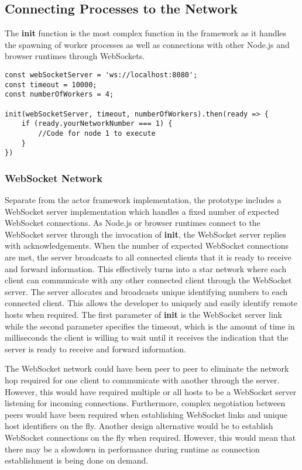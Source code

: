 \documentclass[12pt, a4paper]{report}
\theoremstyle{definition}
\theoremstyle{definition}%
\theoremstyle{definition}%
\theoremstyle{definition}%
\theoremstyle{definition}%
\theoremstyle{definition}%
\begin{document}
\subsection{Connecting Processes to the Network}
The \textbf{init} function is the most complex function in the framework as it handles the spawning of worker processes as well as connections with other Node.js and browser runtimes through WebSockets.
\begin{lstlisting}
const webSocketServer = 'ws://localhost:8080';
const timeout = 10000;
const numberOfWorkers = 4;

init(webSocketServer, timeout, numberOfWorkers).then(ready => {
    if (ready.yourNetworkNumber === 1) {
        //Code for node 1 to execute
    }
})
\end{lstlisting}
 
\subsubsection{WebSocket Network}
Separate from the actor framework implementation, the prototype includes a WebSocket server implementation which handles a fixed number of expected WebSocket connections. As Node.js or browser runtimes connect to the WebSocket server through the invocation of \textbf{init}, the WebSocket server replies with acknowledgements. When the number of expected WebSocket connections are met, the server broadcasts to all connected clients that it is ready to receive and forward information. This effectively turns into a star network where each client can communicate with any other connected client through the WebSocket server. The server allocates and broadcasts unique identifying numbers to each connected client. This allows the developer to uniquely and easily identify remote hosts when required. The first parameter of \textbf{init} is the WebSocket server link while the second parameter specifies the timeout, which is the amount of time in milliseconds the client is willing to wait until it receives the indication that the server is ready to receive and forward information.

The WebSocket network could have been peer to peer to eliminate the network hop required for one client to communicate with another through the server. However, this would have required multiple or all hosts to be a WebSocket server listening for incoming connections. Furthermore, complex negotiation between peers would have been required when establishing WebSocket links and unique host identifiers on the fly. Another design alternative would be to establish WebSocket connections on the fly when required. However, this would mean that there may be a slowdown in performance during runtime as connection establishment is being done on demand.
\end{document}
